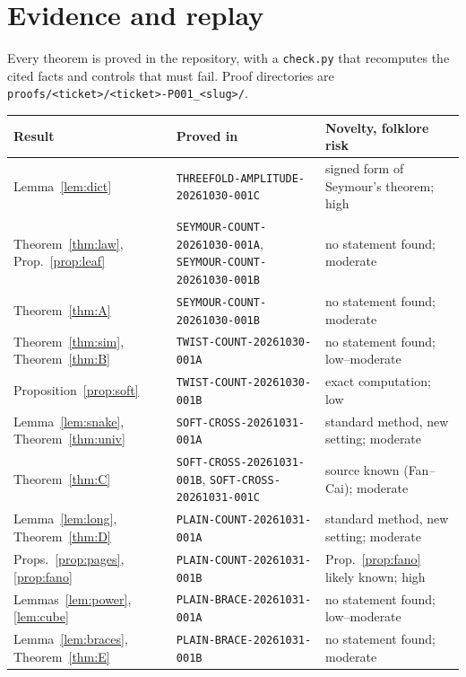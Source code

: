 \documentclass[11pt]{article}
\theoremstyle{definition}
\theoremstyle{remark}
\begin{document}
\section{Evidence and replay}\label{sec:evidence}

Every theorem is proved in the repository, with a \texttt{check.py} that
recomputes the cited facts and controls that must fail. Proof directories are
\texttt{proofs/<ticket>/<ticket>-P001\_<slug>/}.

\begin{center}
\footnotesize
\begin{tabular}{@{}p{3.3cm}p{6.2cm}p{5.2cm}@{}}
\toprule
Result & Proved in & Novelty, folklore risk\\
\midrule
Lemma~\ref{lem:dict} & \texttt{THREEFOLD-AMPLITUDE-20261030-001C} & signed form of Seymour's theorem; high\\
Theorem~\ref{thm:law}, Prop.~\ref{prop:leaf} & \texttt{SEYMOUR-COUNT-20261030-001A}, \texttt{SEYMOUR-COUNT-20261030-001B} & no statement found; moderate\\
Theorem~\ref{thm:A} & \texttt{SEYMOUR-COUNT-20261030-001B} & no statement found; moderate\\
Theorem~\ref{thm:sim}, Theorem~\ref{thm:B} & \texttt{TWIST-COUNT-20261030-001A} & no statement found; low--moderate\\
Proposition~\ref{prop:soft} & \texttt{TWIST-COUNT-20261030-001B} & exact computation; low\\
Lemma~\ref{lem:snake}, Theorem~\ref{thm:univ} & \texttt{SOFT-CROSS-20261031-001A} & standard method, new setting; moderate\\
Theorem~\ref{thm:C} & \texttt{SOFT-CROSS-20261031-001B}, \texttt{SOFT-CROSS-20261031-001C} & source known (Fan--Cai); moderate\\
Lemma~\ref{lem:long}, Theorem~\ref{thm:D} & \texttt{PLAIN-COUNT-20261031-001A} & standard method, new setting; moderate\\
Props.~\ref{prop:pages}, \ref{prop:fano} & \texttt{PLAIN-COUNT-20261031-001B} & Prop.~\ref{prop:fano} likely known; high\\
Lemmas~\ref{lem:power}, \ref{lem:cube} & \texttt{PLAIN-BRACE-20261031-001A} & no statement found; low--moderate\\
Lemma~\ref{lem:braces}, Theorem~\ref{thm:E} & \texttt{PLAIN-BRACE-20261031-001B} & no statement found; moderate\\
\bottomrule
\end{tabular}
\end{center}
\end{document}
